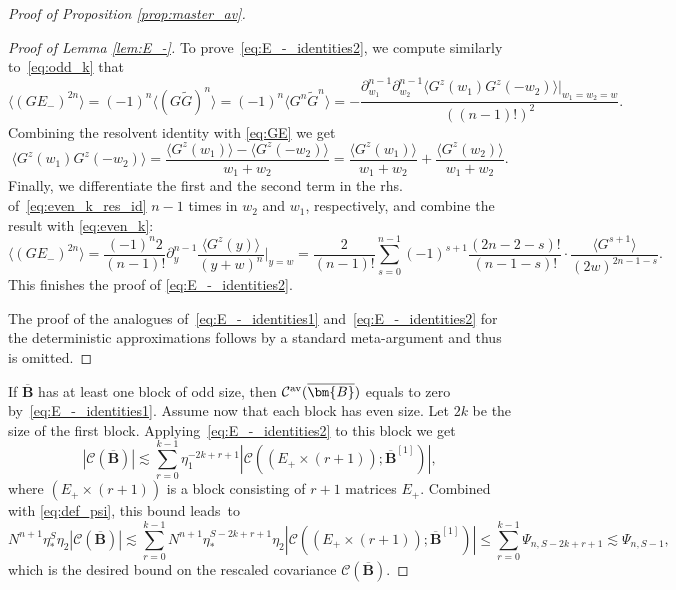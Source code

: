\documentclass[10pt]{amsart}
\numberwithin{equation}{section}
\begin{document}
\begin{proof}[Proof of Proposition \ref{prop:master_av}]
\begin{proof}[Proof of Lemma \ref{lem:E_-}]
To prove~\eqref{eq:E_-_identities2}, we compute similarly to~\eqref{eq:odd_k} that
\begin{equation}
\langle (GE_-)^{2n}\rangle = (-1)^n \langle (G\widetilde{G})^n\rangle =(-1)^n \langle G^n\widetilde{G}^n\rangle = -\frac{\partial_{w_1}^{n-1}\partial_{w_2}^{n-1} \langle G^z(w_1)G^z(-w_2)\rangle\big|_{w_1=w_2=w}}{((n-1)!)^2}.
\label{eq:even_k}
\end{equation}
Combining the resolvent identity with \eqref{eq:GE} we get
\begin{equation}
\langle G^z(w_1)G^z(-w_2)\rangle = \frac{\langle G^z(w_1)\rangle - \langle G^z(-w_2)\rangle}{w_1+w_2} = \frac{\langle G^z(w_1)\rangle}{w_1+w_2} + \frac{\langle G^z(w_2)\rangle}{w_1+w_2}.
\label{eq:even_k_res_id}
\end{equation}
Finally, we differentiate the first and the second term in the rhs. of~\eqref{eq:even_k_res_id} $n-1$ times in $w_2$ and $w_1$, respectively, and combine the result with \eqref{eq:even_k}:
\begin{equation*}
\langle (GE_-)^{2n}\rangle = \frac{(-1)^n2}{(n-1)!}\partial_y^{n-1} \frac{\langle G^z(y)\rangle}{(y+w)^n}\big|_{y=w}= \frac{2}{(n-1)!} \sum_{s=0}^{n-1}(-1)^{s+1} \frac{(2n-2-s)!}{(n-1-s)!} \cdot \frac{\langle G^{s+1}\rangle}{(2w)^{2n-1-s}}.
\end{equation*}
This finishes the proof of \eqref{eq:E_-_identities2}.

The proof of the analogues of~\eqref{eq:E_-_identities1} and~\eqref{eq:E_-_identities2} for the deterministic approximations follows by a standard meta-argument and thus is omitted.
\end{proof}


If $\overline{\bm{B}}$ has at least one block of odd size, then $\mathcal{C}^{\rm{av}}(\overline{\bm{B}})$ equals to zero by~\eqref{eq:E_-_identities1}. Assume now that each block has even size. Let $2k$ be the size of the first block. Applying~\eqref{eq:E_-_identities2} to this block we get
\begin{equation*}
\left\vert\mathcal{C}\left(\overline{\bm{B}}\right)\right\vert \lesssim \sum_{r=0}^{k-1} \eta_1^{-2k+r+1}\left\vert\mathcal{C}\left((E_+\times (r+1));\overline{\bm{B}}^{[1]}\right)\right\vert,
\end{equation*}
where $(E_+\times (r+1))$ is a block consisting of $r+1$ matrices $E_+$. Combined with \eqref{eq:def_psi}, this bound leads~to
\begin{equation*}
N^{n+1} \eta^S_*\eta_2\left\vert\mathcal{C}\left(\overline{\bm{B}}\right)\right\vert \!\lesssim\! \sum_{r=0}^{k-1} N^{n+1}\eta_*^{S-2k+r+1}\eta_2\left\vert\mathcal{C}\left((E_+\times (r+1));\overline{\bm{B}}^{[1]}\right)\right\vert\!\le\! \sum_{r=0}^{k-1} \Psi_{n, S-2k+r+1}\!\lesssim\! \Psi_{n,S-1},
\end{equation*} 
which is the desired bound on the rescaled covariance $\mathcal{C}(\overline{\bm{B}})$.


\end{proof}
\end{document}
